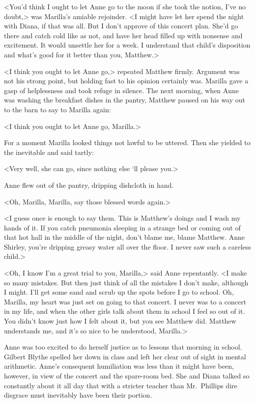 <You'd think I ought to let Anne go to the moon if she took the notion, I've no doubt,> was Marilla's amiable rejoinder. <I might have let her spend the night with Diana, if that was all. But I don't approve of this concert plan. She'd go there and catch cold like as not, and have her head filled up with nonsense and excitement. It would unsettle her for a week. I understand that child's disposition and what's good for it better than you, Matthew.>

<I think you ought to let Anne go,> repeated Matthew firmly. Argument was not his strong point, but holding fast to his opinion certainly was. Marilla gave a gasp of helplessness and took refuge in silence. The next morning, when Anne was washing the breakfast dishes in the pantry, Matthew paused on his way out to the barn to say to Marilla again:

<I think you ought to let Anne go, Marilla.>

For a moment Marilla looked things not lawful to be uttered. Then she yielded to the inevitable and said tartly:

<Very well, she can go, since nothing else ‘ll please you.>

Anne flew out of the pantry, dripping dishcloth in hand.

<Oh, Marilla, Marilla, say those blessed words again.>

<I guess once is enough to say them. This is Matthew's doings and I wash my hands of it. If you catch pneumonia sleeping in a strange bed or coming out of that hot hall in the middle of the night, don't blame me, blame Matthew. Anne Shirley, you're dripping greasy water all over the floor. I never saw such a careless child.>

<Oh, I know I'm a great trial to you, Marilla,> said Anne repentantly. <I make so many mistakes. But then just think of all the mistakes I don't make, although I might. I'll get some sand and scrub up the spots before I go to school. Oh, Marilla, my heart was just set on going to that concert. I never was to a concert in my life, and when the other girls talk about them in school I feel so out of it. You didn't know just how I felt about it, but you see Matthew did. Matthew understands me, and it's so nice to be understood, Marilla.>

Anne was too excited to do herself justice as to lessons that morning in school. Gilbert Blythe spelled her down in class and left her clear out of sight in mental arithmetic. Anne's consequent humiliation was less than it might have been, however, in view of the concert and the spare-room bed. She and Diana talked so constantly about it all day that with a stricter teacher than Mr.~Phillips dire disgrace must inevitably have been their portion.

